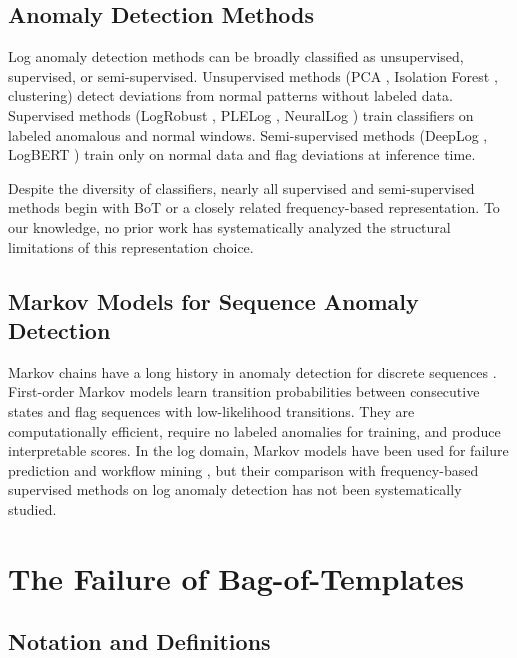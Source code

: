 \documentclass[11pt]{article}
\begin{document}
\subsection{Anomaly Detection Methods}

Log anomaly detection methods can be broadly classified as unsupervised, supervised, or semi-supervised.
Unsupervised methods (PCA \cite{xu2009detecting}, Isolation Forest \cite{liu2008isolation}, clustering) detect deviations from normal patterns without labeled data.
Supervised methods (LogRobust \cite{zhang2019robust}, PLELog \cite{yang2021plelog}, NeuralLog \cite{le2021neurallog}) train classifiers on labeled anomalous and normal windows.
Semi-supervised methods (DeepLog \cite{du2017deeplog}, LogBERT \cite{guo2021logbert}) train only on normal data and flag deviations at inference time.

Despite the diversity of classifiers, nearly all supervised and semi-supervised methods begin with BoT or a closely related frequency-based representation.
To our knowledge, no prior work has systematically analyzed the structural limitations of this representation choice.

\subsection{Markov Models for Sequence Anomaly Detection}

Markov chains have a long history in anomaly detection for discrete sequences \cite{ye2000robustness,chandola2009anomaly}.
First-order Markov models learn transition probabilities between consecutive states and flag sequences with low-likelihood transitions.
They are computationally efficient, require no labeled anomalies for training, and produce interpretable scores.
In the log domain, Markov models have been used for failure prediction \cite{fu2009execution} and workflow mining \cite{van2004workflow}, but their comparison with frequency-based supervised methods on log anomaly detection has not been systematically studied.

\section{The Failure of Bag-of-Templates}
\label{sec:failure}

\subsection{Notation and Definitions}
\end{document}
